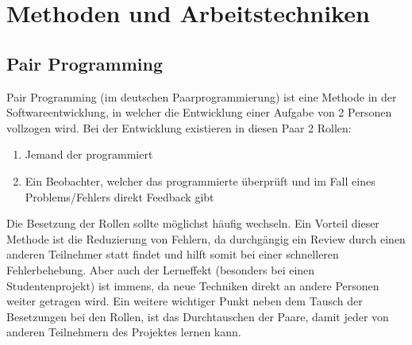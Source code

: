 \section{Methoden und Arbeitstechniken}
\subsection{Pair Programming}
Pair Programming (im deutschen Paarprogrammierung) ist eine Methode in der Softwareentwicklung, in welcher die Entwicklung einer Aufgabe von 2 Personen vollzogen wird. Bei der Entwicklung existieren in diesen Paar 2 Rollen:
\begin{enumerate}
	\item Jemand der programmiert
	\item Ein Beobachter, welcher das programmierte überprüft und im Fall eines Problems/Fehlers direkt Feedback gibt
\end{enumerate}
Die Besetzung der Rollen sollte möglichst häufig wechseln. Ein Vorteil dieser Methode ist die Reduzierung von Fehlern, da durchgängig ein Review durch einen anderen Teilnehmer statt findet und hilft somit bei einer schnelleren Fehlerbehebung. Aber auch der Lerneffekt (besonders bei einen Studentenprojekt) ist immens, da neue Techniken direkt an andere Personen weiter getragen wird. Ein weitere wichtiger Punkt neben dem Tausch der Besetzungen bei den Rollen, ist das Durchtauschen der Paare, damit jeder von anderen Teilnehmern des Projektes lernen kann.


